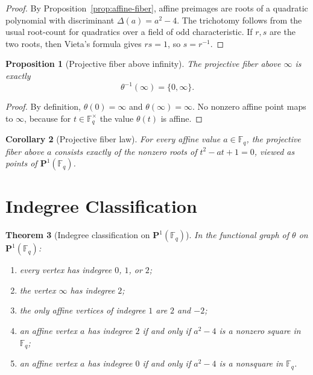 \documentclass[11pt]{article}
\newtheorem{theorem}{Theorem}
\newtheorem{proposition}[theorem]{Proposition}
\newtheorem{corollary}[theorem]{Corollary}
\newcommand{\F}{\mathbb{F}}
\newcommand{\Pone}{\mathbf{P}^1}
\begin{document}
\begin{proof}
By Proposition~\ref{prop:affine-fiber}, affine preimages are roots of a quadratic polynomial with discriminant $\Delta(a)=a^2-4$.
The trichotomy follows from the usual root-count for quadratics over a field of odd characteristic.
If $r,s$ are the two roots, then Vieta's formula gives $rs=1$, so $s=r^{-1}$.
\end{proof}

\begin{proposition}[Projective fiber above infinity]
\label{prop:infty-fiber}
The projective fiber above $\infty$ is exactly
\[
\theta^{-1}(\infty)=\{0,\infty\}.
\]
\end{proposition}

\begin{proof}
By definition, $\theta(0)=\infty$ and $\theta(\infty)=\infty$.
No nonzero affine point maps to $\infty$, because for $t\in\F_q^\times$ the value $\theta(t)$ is affine.
\end{proof}

\begin{corollary}[Projective fiber law]
\label{cor:projective-fiber}
For every affine value $a\in\F_q$, the projective fiber above $a$ consists exactly of the nonzero roots of $t^2-at+1=0$, viewed as points of $\Pone(\F_q)$.
\end{corollary}

\section{Indegree Classification}

\begin{theorem}[Indegree classification on $\Pone(\F_q)$]
\label{thm:indegree}
In the functional graph of $\theta$ on $\Pone(\F_q)$:
\begin{enumerate}[label=\textup{(\roman*)}]
\item every vertex has indegree $0$, $1$, or $2$;
\item the vertex $\infty$ has indegree $2$;
\item the only affine vertices of indegree $1$ are $2$ and $-2$;
\item an affine vertex $a$ has indegree $2$ if and only if $a^2-4$ is a nonzero square in $\F_q$;
\item an affine vertex $a$ has indegree $0$ if and only if $a^2-4$ is a nonsquare in $\F_q$.
\end{enumerate}
\end{theorem}
\end{document}
